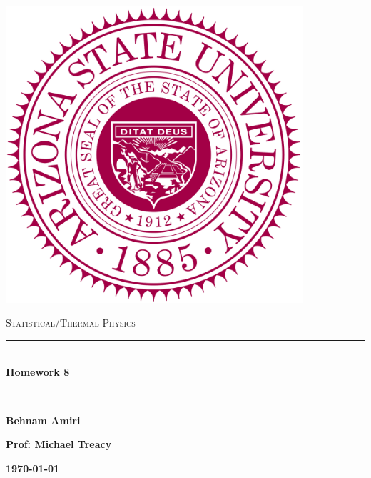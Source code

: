 \documentclass[fleqn]{article}
\begin{document}
  \begin{titlepage}

    \newcommand{\HRule}{\rule{\linewidth}{0.5mm}}

    \center

    \begin{center}
      \includegraphics[height=11cm, width=11cm]{asu.png}
    \end{center}

    \vline

    \textsc{\LARGE Statistical/Thermal Physics}\\[1.5cm]

    \HRule \\[0.5cm]
    { \huge \bfseries Homework 8}\\[0.4cm] 
    \HRule \\[1.0cm]

    \textbf{Behnam Amiri}

    \bigbreak

    \textbf{Prof: Michael Treacy}

    \bigbreak

    \textbf{{\large \today}\\[2cm]}

    \vfill

  \end{titlepage}
\end{document}
